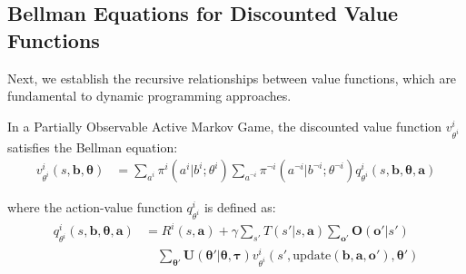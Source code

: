 \subsection{Bellman Equations for Discounted Value Functions}
Next, we establish the recursive relationships between value functions, which
are fundamental to dynamic programming approaches.
\begin{lemma}
    In a Partially Observable Active Markov Game, the discounted value function
    $v^{i}_{\theta^i}$ satisfies the Bellman equation:
    \begin{align}
        v^{i}_{\theta^i}(s, \boldsymbol{b}, \boldsymbol{\theta}) & = \sum_{a^i}\pi^{i}(a^{i}|b^{i}; \theta^{i}) \sum_{a^{\neg i}}\pi^{\neg i}(a^{\neg i}|b^{\neg i}; \theta^{\neg i}) q^{i}_{\theta^i}(s, \boldsymbol{b}, \boldsymbol{\theta}, \boldsymbol{a})
    \end{align}

    where the action-value function $q^{i}_{\theta^i}$ is defined as:
    \begin{align}
        q^{i}_{\theta^i}(s, \boldsymbol{b}, \boldsymbol{\theta}, \boldsymbol{a}) & = R^{i}(s, \boldsymbol{a}) + \gamma \sum_{s'}T(s'|s, \boldsymbol{a}) \sum_{\boldsymbol{o}'}\boldsymbol{O}(\boldsymbol{o}'|s') \nonumber                                                                                 \\
                                                                                 & \quad \sum_{\boldsymbol{\theta}'}\boldsymbol{U}(\boldsymbol{\theta}'|\boldsymbol{\theta}, \boldsymbol{\tau}) v^{i}_{\theta^i}(s', \text{update}(\boldsymbol{b}, \boldsymbol{a}, \boldsymbol{o}'), \boldsymbol{\theta}')
    \end{align}
\end{lemma}
